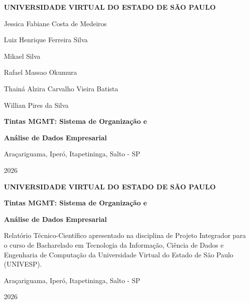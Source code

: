 \documentclass[12pt,a4paper]{article}
\begin{document}
\setcounter{page}{1}
\sloppy


\begin{titlepage}
\centering
{\large\bfseries UNIVERSIDADE VIRTUAL DO ESTADO DE SÃO PAULO\par}
\vspace{2cm}
{\normalsize Jessica Fabiane Costa de Medeiros\par}
{\normalsize Luiz Henrique Ferreira Silva\par}
{\normalsize Mikael Silva\par}
{\normalsize Rafael Massao Okumura\par}
{\normalsize Thainá Alzira Carvalho Vieira Batista\par}
{\normalsize Willian Pires da Silva\par}
\vspace{2.5cm}
{\large\bfseries Tintas MGMT: Sistema de Organização e\par}
\vspace{0.3cm}
{\large\bfseries Análise de Dados Empresarial\par}
\vspace{3cm}
\vfill
{\large Araçariguama, Iperó, Itapetininga, Salto - SP\par}
{\large 2026\par}

\end{titlepage}
\pagestyle{empty}

\pagebreak
\thispagestyle{empty}
\begin{center}
{\large\bfseries UNIVERSIDADE VIRTUAL DO ESTADO DE SÃO PAULO\par}
\vspace{2cm}
\vspace{2.5cm}
{\large\bfseries Tintas MGMT: Sistema de Organização e\par}
\vspace{0.3cm}
{\large\bfseries Análise de Dados Empresarial\par}
\vspace{3cm}
{\linespread{1}\selectfont\leftskip=7cm   Relatório Técnico-Científico apresentado na disciplina de Projeto Integrador para o curso de Bacharelado em Tecnologia da Informação, Ciência de Dados e Engenharia de Computação da Universidade Virtual do Estado de São Paulo (UNIVESP).\par}
\vfill
{\large Araçariguama, Iperó, Itapetininga, Salto - SP\par}
{\large 2026\par}
\end{center}
\end{document}
